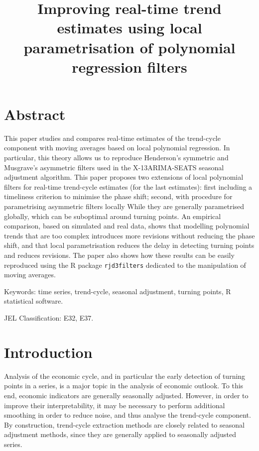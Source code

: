 \documentclass[
]{article}
\title{Improving real-time trend estimates using local parametrisation
of polynomial regression filters}
\author{}
\date{}
\newcommand\1{\mathds{1}}
\begin{document}
\maketitle

\section*{Abstract}\label{abstract}

This paper studies and compares real-time estimates of the trend-cycle
component with moving averages based on local polynomial regression. In
particular, this theory allows us to reproduce Henderson's symmetric and
Musgrave's asymmetric filters used in the X-13ARIMA-SEATS seasonal
adjustment algorithm. This paper proposes two extensions of local
polynomial filters for real-time trend-cycle estimates (for the last
estimates): first including a timeliness criterion to minimise the phase
shift; second, with procedure for parametrising asymmetric filters
locally While they are generally parametrised globally, which can be
suboptimal around turning points. An empirical comparison, based on
simulated and real data, shows that modelling polynomial trends that are
too complex introduces more revisions without reducing the phase shift,
and that local parametrisation reduces the delay in detecting turning
points and reduces revisions. The paper also shows how these results can
be easily reproduced using the R package \texttt{rjd3filters} dedicated
to the manipulation of moving averages.

Keywords: time series, trend-cycle, seasonal adjustment, turning points,
R statistical software.

JEL Classification: E32, E37.

\section{Introduction}\label{introduction}

Analysis of the economic cycle, and in particular the early detection of
turning points in a series, is a major topic in the analysis of economic
outlook. To this end, economic indicators are generally seasonally
adjusted. However, in order to improve their interpretability, it may be
necessary to perform additional smoothing in order to reduce noise, and
thus analyse the trend-cycle component. By construction, trend-cycle
extraction methods are closely related to seasonal adjustment methods,
since they are generally applied to seasonally adjusted series.
\end{document}

